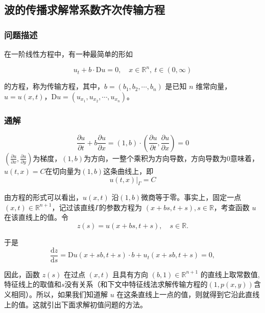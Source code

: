\documentclass[12pt,a4paper]{article}
\numberwithin{subsection}{section}   %
\numberwithin{subsubsection}{subsection}
\theoremstyle{plain}
\theoremstyle{definition}
\theoremstyle{remark}
\theoremstyle{remark}
\begin{document}
	
	\subsection{波的传播求解常系数齐次传输方程} 
	\subsubsection{问题描述}
	在一阶线性方程中，有一种最简单的形如
	
	\begin{equation}
		u_t + b \cdot \mathrm{D}u = 0, \quad x \in \mathbb{R}^n, \ t \in (0, \infty)
	\end{equation}
	
	的方程，称为传输方程，其中，\(b = (b_1, b_2, \cdots, b_n)\) 是已知 \(n\) 维常向量，\(u = u(x, t)\)，\(\mathrm{D}u = (u_{x_1}, u_{x_2}, \cdots, u_{x_n})\)。
	
		\subsubsection{通解} 
			\begin{equation}
			\frac{\partial u}{\partial t} + b \frac{\partial u}{\partial x}=(1, b) \cdot \left( \frac{\partial u}{\partial t}, \frac{\partial u}{\partial x} \right) = 0 
		\end{equation}
		$\left( \frac{\partial u}{\partial x}, \frac{\partial u}{\partial y} \right)$为梯度，$(1, b)$为方向，一整个乘积为方向导数，方向导数为0意味着，$u(t, x)=C$在切向量为$(1, b)$这条曲线上，即
		\begin{equation}
			u(t,x)|_{\Gamma} = C
		\end{equation}
		
	
	由方程的形式可以看出，\(u(x, t)\) 沿$(1, b)$微商等于零。事实上，固定一点 \((x, t) \in \mathbb{R}^{n+1}\)，记过该直线$\Gamma$的参数方程为 \((x + bs, t + s), s \in \mathbb{R}\)，考查函数 \(u\) 在该直线上的值。令
\begin{equation}
	z(s) = u(x + bs, t + s), \quad s \in \mathbb{R}.
	\end{equation}
	
	于是
	\begin{equation}
	\frac{\mathrm{d}z}{\mathrm{d}s} = \mathrm{D}u(x + sb, t + s) \cdot b + u_t(x + sb, t + s) = 0,
	\end{equation}
	
	因此，函数 \(z(s)\) 在过点 \((x, t)\) 且具有方向 \((b, 1) \in \mathbb{R}^{n+1}\) 的直线上取常数值,特征线上的取值和$s$没有关系（和下文中特征线法求解传输方程的$(1, p(x, y))$含义相同）。所以，如果我们知道解 \(u\) 在这条直线上一点的值，则就得到它沿此直线上的值。这就引出下面求解初值问题的方法。
	
\end{document}
